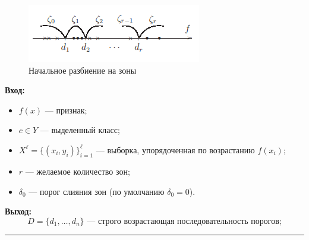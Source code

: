 \begin{figure}
    \centering
    \includegraphics[scale = 1]{chapters/logical/images/bin2.png}
    \caption{Начальное разбиение на зоны}
\end{figure}

\newpage
\textbf{Вход:}
\begin{itemize}
    \item $f(x)$ — признак;
    \item $c \in Y$ — выделенный класс;
    \item $X^\ell = \{(x_i, y_i)\}_{i=1}^\ell$ — выборка, упорядоченная по возрастанию $f(x_i)$;
    \item $r$ — желаемое количество зон;
    \item $\delta_0$ — порог слияния зон (по умолчанию $\delta_0 = 0$).
\end{itemize}

\textbf{Выход:}
\[
D = \{d_1, \dots, d_n\} \text{ — строго возрастающая последовательность порогов;}
\]

\hrule

